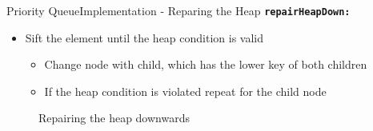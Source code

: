 \begin{frame}{Priority Queue}{Implementation - Reparing the Heap}
  {\color{Mittel-Blau}\texttt{\textbf{repairHeapDown:}}}
  \begin{itemize}
    \item
      {\color{Mittel-Blau}Sift} the element until the
      {\color{Mittel-Blau}heap condition} is valid
      \begin{itemize}
        \item
          Change node with child, which has the lower key of both children
        \item
          If the {\color{Mittel-Blau}heap condition} is violated repeat for
          the child node
      \end{itemize}
  \end{itemize}
  \begin{center}
    \begin{figure}[!h]%
      \begin{columns}%
        \begin{column}{0.45\linewidth}%
          \begin{adjustbox}{width=\linewidth}%
          \end{adjustbox}%
        \end{column}%
        \begin{column}{0.45\linewidth}%
          \begin{adjustbox}{width=\linewidth}%
          \end{adjustbox}%
        \end{column}%
      \end{columns}%
      \caption{Repairing the heap downwards}%
      \label{fig:priority_queue:impl_repair_heap_down2}%
    \end{figure}
  \end{center}
\end{frame}


